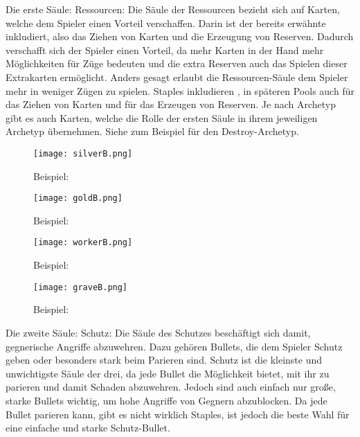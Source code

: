 Die erste Säule: Ressourcen:
Die Säule der Ressourcen bezieht sich auf Karten, welche dem Spieler einen Vorteil verschaffen. Darin ist der bereits
erwähnte  inkludiert, also das Ziehen von Karten und die Erzeugung von Reserven. Dadurch verschafft sich der Spieler einen Vorteil,
da mehr Karten in der Hand mehr Möglichkeiten für Züge bedeuten und die extra Reserven auch das Spielen dieser Extrakarten ermöglicht.
Anders gesagt erlaubt die Ressourcen-Säule dem Spieler mehr in weniger Zügen zu spielen.
Staples inkludieren , in späteren Pools auch  für das Ziehen von Karten und  für das Erzeugen von Reserven.
Je nach Archetyp gibt es auch Karten, welche die Rolle der ersten Säule in ihrem jeweiligen Archetyp übernehmen.
Siehe zum Beispiel  für den Destroy-Archetyp.

\begin{figure}[H]
    \centering
    \texttt{[image: silverB.png]}
    \caption{Beispiel: }
\end{figure}

\begin{figure}[H]
    \centering
    \texttt{[image: goldB.png]}
    \caption{Beispiel: }
\end{figure}

\begin{figure}[H]
    \centering
    \texttt{[image: workerB.png]}
    \caption{Beispiel: }
\end{figure}

\begin{figure}[H]
    \centering
    \texttt{[image: graveB.png]}
    \caption{Beispiel: }
\end{figure}


Die zweite Säule: Schutz:
Die Säule des Schutzes beschäftigt sich damit, gegnerische Angriffe abzuwehren. Dazu gehören Bullets, die dem Spieler
Schutz geben oder besonders stark beim Parieren sind. Schutz ist die kleinste und unwichtigste Säule der drei,
da jede Bullet die Möglichkeit bietet, mit ihr zu parieren und damit Schaden abzuwehren. Jedoch sind auch einfach nur große,
starke Bullets wichtig, um hohe Angriffe von Gegnern abzublocken. Da jede Bullet parieren kann, gibt es nicht wirklich Staples,
 ist jedoch die beste Wahl für eine einfache und starke Schutz-Bullet.

